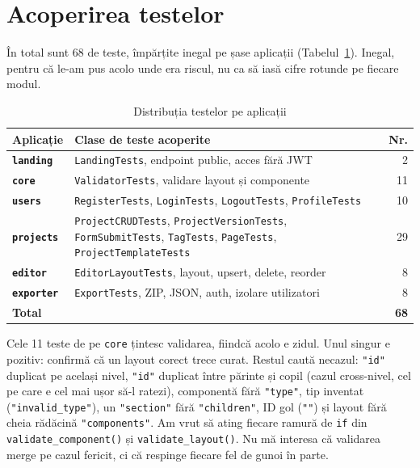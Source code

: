 \documentclass[12pt,a4paper]{report}
\begin{document}
\section{Acoperirea testelor}

În total sunt 68 de teste, împărțite inegal pe șase aplicații
(Tabelul~\ref{tab:tests}). Inegal, pentru că le-am pus acolo unde era riscul, nu ca
să iasă cifre rotunde pe fiecare modul.

\begin{table}[htbp]
  \centering
  \caption{Distribuția testelor pe aplicații}
  \label{tab:tests}
  \renewcommand{\arraystretch}{1.3}
  \begin{tabularx}{\textwidth}{>{\bfseries}l X r}
    \toprule
    Aplicație & Clase de teste acoperite & Nr. \\
    \midrule
    \texttt{landing}  & \texttt{LandingTests}, endpoint public, acces fără JWT & 2 \\
    \texttt{core}     & \texttt{ValidatorTests}, validare layout și componente & 11 \\
    \texttt{users}    & \texttt{RegisterTests}, \texttt{LoginTests},
                        \texttt{LogoutTests}, \texttt{ProfileTests} & 10 \\
    \texttt{projects} & \texttt{ProjectCRUDTests}, \texttt{ProjectVersionTests},
                        \texttt{FormSubmitTests}, \texttt{TagTests},
                        \texttt{PageTests}, \texttt{ProjectTemplateTests} & 29 \\
    \texttt{editor}   & \texttt{EditorLayoutTests}, layout, upsert, delete, reorder & 8 \\
    \texttt{exporter} & \texttt{ExportTests}, ZIP, JSON, auth, izolare utilizatori & 8 \\
    \midrule
    \textbf{Total} & & \textbf{68} \\
    \bottomrule
  \end{tabularx}
\end{table}

Cele 11 teste de pe \texttt{core} țintesc validarea, fiindcă acolo e zidul. Unul
singur e pozitiv: confirmă că un layout corect trece curat. Restul caută necazul:
\texttt{"id"} duplicat pe același nivel, \texttt{"id"} duplicat între părinte și copil
(cazul cross-nivel, cel pe care e cel mai ușor să-l ratezi), componentă fără
\texttt{"type"}, tip inventat (\texttt{"invalid\_type"}), un \texttt{"section"} fără
\texttt{"children"}, ID gol (\texttt{""}) și layout fără cheia rădăcină
\texttt{"components"}. Am vrut să ating fiecare ramură de \texttt{if} din
\texttt{validate\_component()} și \texttt{validate\_layout()}. Nu mă interesa că
validarea merge pe cazul fericit, ci că respinge fiecare fel de gunoi în parte.
\end{document}
